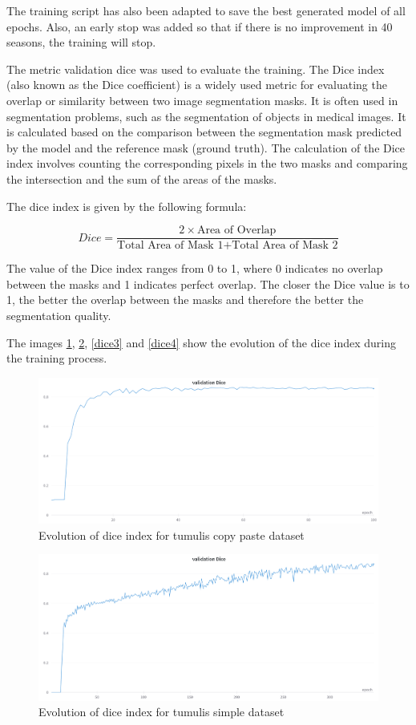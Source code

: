 The training script has also been adapted to save the best generated model of all epochs. Also, an early stop was added so that if there is no improvement in 40 seasons, the training will stop.

The metric validation dice was used to evaluate the training. The Dice index (also known as the Dice coefficient) is a widely used metric for evaluating the overlap or similarity between two image segmentation masks. It is often used in segmentation problems, such as the segmentation of objects in medical images. It is calculated based on the comparison between the segmentation mask predicted by the model and the reference mask (ground truth). The calculation of the Dice index involves counting the corresponding pixels in the two masks and comparing the intersection and the sum of the areas of the masks.

The dice index is given by the following formula:

\begin{equation}
    Dice = \frac{2 \times \text{Area of Overlap}}{\text{Total Area of Mask 1} + \text{Total Area of Mask 2}}
\end{equation}

The value of the Dice index ranges from 0 to 1, where 0 indicates no overlap between the masks and 1 indicates perfect overlap. The closer the Dice value is to 1, the better the overlap between the masks and therefore the better the segmentation quality.

The images \ref{dice1}, \ref{dice2}, \ref{dice3} and \ref{dice4} show the evolution of the dice index during the training process.

\begin{figure}[H]
\centering
\includegraphics[width=12cm]{images/unet/mamoas_copy.png}
\caption{Evolution of dice index for tumulis copy paste dataset}
\label{dice1}
\end{figure}

\begin{figure}[H]
\centering
\includegraphics[width=12cm]{images/unet/mamoas_simple.png}
\caption{Evolution of dice index for tumulis simple dataset}
\label{dice2}
\end{figure}

